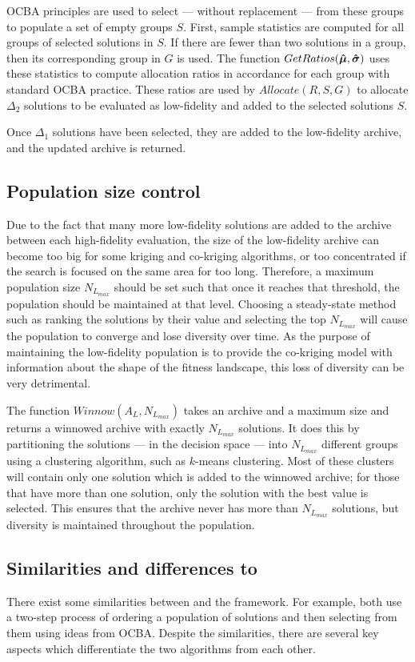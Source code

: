 OCBA principles are used to select --- without replacement --- from these groups to populate a set of empty groups $S$. First, sample statistics are computed for all groups of selected solutions in $S$. If there are fewer than two solutions in a group, then its corresponding group in $G$ is used. The function $GetRatios(\boldsymbol{\hat{\mu}},\boldsymbol{\hat{\sigma}})$ uses these statistics to compute allocation ratios in accordance for each group with standard OCBA practice. These ratios are used by $Allocate(R,S,G)$ to allocate $\Delta_2$ solutions to be evaluated as low-fidelity and added to the selected solutions $S$.

Once $\Delta_1$ solutions have been selected, they are added to the low-fidelity archive, and the updated archive is returned.

\subsection{Population size control}
Due to the fact that many more low-fidelity solutions are added to the archive between each high-fidelity evaluation, the size of the low-fidelity archive can become too big for some kriging and co-kriging algorithms, or too concentrated if the search is focused on the same area for too long. Therefore, a maximum population size $N_{L_{max}}$ should be set such that once it reaches that threshold, the population should be maintained at that level. Choosing a steady-state method such as ranking the solutions by their value and selecting the top $N_{L_{max}}$ will cause the population to converge and lose diversity over time. As the purpose of maintaining the low-fidelity population is to provide the co-kriging model with information about the shape of the fitness landscape, this loss of diversity can be very detrimental. 

The function $Winnow(A_L,N_{L_{max}})$ takes an archive and a maximum size and returns a winnowed archive with exactly $N_{L_{max}}$ solutions. It does this by partitioning the solutions --- in the decision space --- into $N_{L_{max}}$ different groups using a clustering algorithm, such as $k$-means clustering. Most of these clusters will contain only one solution which is added to the winnowed archive; for those that have more than one solution, only the solution with the best value is selected. This ensures that the archive never has more than $N_{L_{max}}$ solutions, but diversity is maintained throughout the population.

\subsection{Similarities and differences to \motos{}}
There exist some similarities between \AlgName{} and the \motos{} framework. For example, both use a two-step process of ordering a population of solutions and then selecting from them using ideas from OCBA. Despite the similarities, there are several key aspects which differentiate the two algorithms from each other. 

